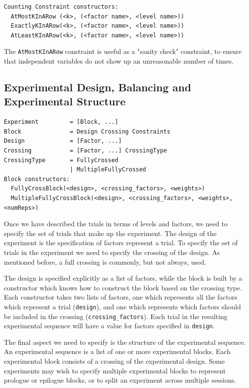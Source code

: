 \begin{verbatim}
Counting Constraint constructors:
  AtMostKInARow (<k>, (<factor name>, <level name>))
  ExactlyKInARow(<k>, (<factor name>, <level name>))
  AtLeastKInARow(<k>, (<factor name>, <level name>))
\end{verbatim}

The \texttt{AtMostKInARow} constraint is useful as a "sanity check" constraint, to ensure that independent variables do not show up an unreasonable number of times.

\subsection{Experimental Design, Balancing and Experimental Structure}

\begin{verbatim}
Experiment         = [Block, ...]
Block              = Design Crossing Constraints
Design             = [Factor, ...]
Crossing           = [Factor, ...] CrossingType
CrossingType       = FullyCrossed
                   | MultipleFullyCrossed
Block constructors:
  FullyCrossBlock(<design>, <crossing_factors>, <weights>)
  MultipleFullyCrossBlock(<design>, <crossing_factors>, <weights>, <numReps>)
\end{verbatim}

Once we have described the trials in terms of levels and factors, we need to specify the set of trials that make up the experiment. The design of the experiment is the specification of factors represent a trial. To specify the set of trials in the experiment we need to specify the crossing of the design. As mentioned before, a full crossing is commonly, but not always, used.

The design is specified explicitly as a list of factors, while the block is built by a constructor which knows how to construct the block based on the crossing type. Each constructor takes two lists of factors, one which represents all the factors which represent a trial (\texttt{design}), and one which represents which factors should be included in the crossing (\texttt{crossing\_factors}). Each trial in the resulting experimental sequence will have a value for factors specified in \texttt{design}.

The final aspect we need to specify is the structure of the experimental sequence. An experimental sequence is a list of one or more experimental blocks. Each experimental block consists of a crossing of the experimental design. Some experiments may wish to specify multiple experimental blocks to represent prologue or epilogue blocks, or to split an experiment across multiple sessions.

